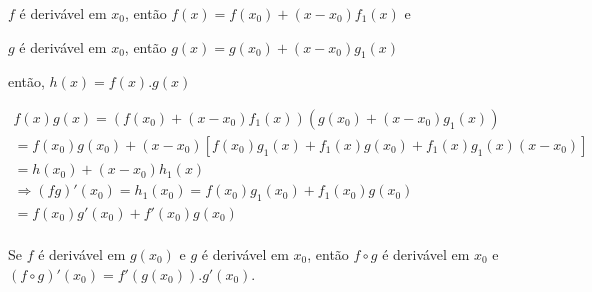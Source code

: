 \documentclass[11pt, oneside, a4paper]{gsm-l}
\begin{document}
\begin{dem}

$f$ é derivável em $x_0 $, então $f\left( x \right) = f\left( {x_0
} \right) + \left( {x - x_0 } \right)f_1 \left( x \right)$ e

$g$ é derivável em $x_0 $, então $g\left( x \right) = g\left( {x_0
} \right) + \left( {x - x_0 } \right)g_1 \left( x \right)$

então, $h\left( x \right) = f\left( x \right).g\left( x \right)$

\[
\begin{array}{l}
f\left( x \right)g\left( x \right) = \left( {f\left( {x_0 } \right) +
\left( {x - x_0 } \right)f_1 \left( x \right)} \right)\left( {g\left( {x_0 }
\right) + \left( {x - x_0 } \right)g_1 \left( x \right)} \right) \\
= f\left( {x_0 } \right)g\left( {x_0 } \right) + \left( {x - x_0 }
\right)\left[ {f\left( {x_0 } \right)g_1 \left( x \right) + f_1 \left( x
\right)g\left( {x_0 } \right) + f_1 \left( x \right)g_1 \left( x
\right)\left( {x - x_0 } \right)} \right] \\
= h\left( {x_0 } \right) + \left( {x - x_0 } \right)h_1 \left( x \right) \\
\Rightarrow \left( {fg} \right)'\left( {x_0 } \right) = h_1 \left( {x_0 }
\right) = f\left( {x_0 } \right)g_1 \left( {x_0 } \right) + f_1 \left( {x_0
} \right)g\left( {x_0 } \right) \\
= f\left( {x_0 } \right)g'\left( {x_0 } \right) + f'\left( {x_0 }
\right)g\left( {x_0 } \right) \\
\end{array}
\]

\end{dem}

\begin{teo}

Se $f$ é derivável em $g\left( {x_0 } \right)$ e $g$ é
derivável em $x_0 $, então $f \circ g$ é derivável em $x_0 $
e $\left( {f \circ g} \right)'\left( {x_0 } \right) = f'\left( {g\left( {x_0
} \right)} \right).g'\left( {x_0 } \right)$.

\end{teo}
\end{document}
